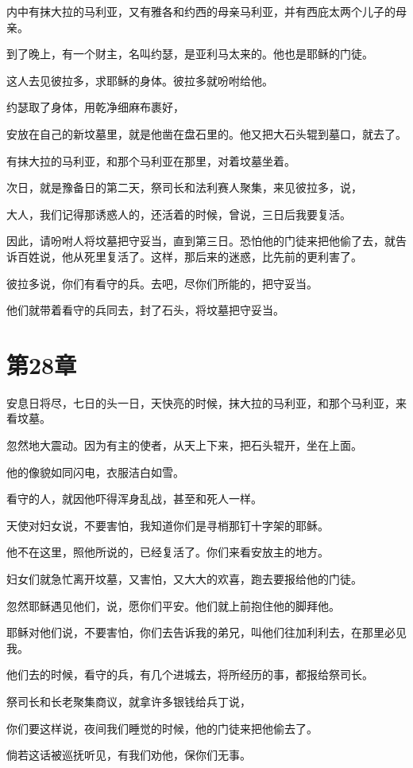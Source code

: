 \documentclass[12pt,oneside]{book}
\begin{document}
内中有抹大拉的马利亚，又有雅各和约西的母亲马利亚，并有西庇太两个儿子的母亲。

到了晚上，有一个财主，名叫约瑟，是亚利马太来的。他也是耶稣的门徒。

这人去见彼拉多，求耶稣的身体。彼拉多就吩咐给他。

约瑟取了身体，用乾净细麻布裹好，

安放在自己的新坟墓里，就是他凿在盘石里的。他又把大石头辊到墓口，就去了。

有抹大拉的马利亚，和那个马利亚在那里，对着坟墓坐着。

次日，就是豫备日的第二天，祭司长和法利赛人聚集，来见彼拉多，说，

大人，我们记得那诱惑人的，还活着的时候，曾说，三日后我要复活。

因此，请吩咐人将坟墓把守妥当，直到第三日。恐怕他的门徒来把他偷了去，就告诉百姓说，他从死里复活了。这样，那后来的迷惑，比先前的更利害了。

彼拉多说，你们有看守的兵。去吧，尽你们所能的，把守妥当。

他们就带着看守的兵同去，封了石头，将坟墓把守妥当。

\chapter{第28章}
安息日将尽，七日的头一日，天快亮的时候，抹大拉的马利亚，和那个马利亚，来看坟墓。

忽然地大震动。因为有主的使者，从天上下来，把石头辊开，坐在上面。

他的像貌如同闪电，衣服洁白如雪。

看守的人，就因他吓得浑身乱战，甚至和死人一样。

天使对妇女说，不要害怕，我知道你们是寻梢那钉十字架的耶稣。

他不在这里，照他所说的，已经复活了。你们来看安放主的地方。

妇女们就急忙离开坟墓，又害怕，又大大的欢喜，跑去要报给他的门徒。

忽然耶稣遇见他们，说，愿你们平安。他们就上前抱住他的脚拜他。

耶稣对他们说，不要害怕，你们去告诉我的弟兄，叫他们往加利利去，在那里必见我。

他们去的时候，看守的兵，有几个进城去，将所经历的事，都报给祭司长。

祭司长和长老聚集商议，就拿许多银钱给兵丁说，

你们要这样说，夜间我们睡觉的时候，他的门徒来把他偷去了。

倘若这话被巡抚听见，有我们劝他，保你们无事。
\end{document}
